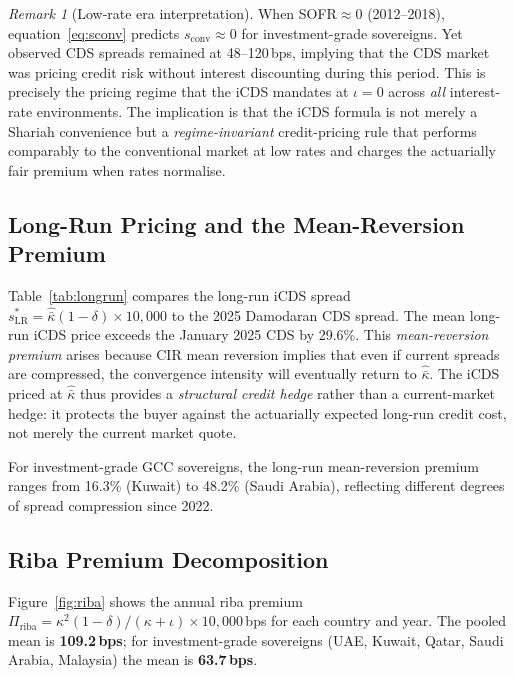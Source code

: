 \documentclass[12pt]{article}
\theoremstyle{plain}
\theoremstyle{definition}
\theoremstyle{remark}
\newtheorem{remark}{Remark}[section]
\begin{document}


\begin{remark}[Low-rate era interpretation]
  \label{rem:lowrate}
  When SOFR$\approx 0$ (2012--2018), equation~\eqref{eq:sconv} predicts
  $s_{\text{conv}} \approx 0$ for investment-grade sovereigns.
  Yet observed CDS spreads remained at 48--120\,bps, implying that the CDS
  market was pricing credit risk without interest discounting during this period.
  This is precisely the pricing regime that the iCDS mandates at $\iota=0$
  across \emph{all} interest-rate environments.
  The implication is that the iCDS formula is not merely a Shariah
  convenience but a \emph{regime-invariant} credit-pricing rule that performs
  comparably to the conventional market at low rates and charges the actuarially
  fair premium when rates normalise.
\end{remark}

\subsection{Long-Run Pricing and the Mean-Reversion Premium}

Table~\ref{tab:longrun} compares the long-run iCDS spread
$s^*_{\text{LR}} = \hat{\bar{\kappa}}(1-\delta)\times 10{,}000$
to the 2025 Damodaran CDS spread.
The mean long-run iCDS price exceeds the January 2025 CDS by 29.6\%.
This \emph{mean-reversion premium} arises because CIR mean reversion implies
that even if current spreads are compressed, the convergence intensity will
eventually return to $\hat{\bar{\kappa}}$.
The iCDS priced at $\hat{\bar{\kappa}}$ thus provides a \emph{structural
credit hedge} rather than a current-market hedge: it protects the buyer
against the actuarially expected long-run credit cost, not merely the
current market quote.

For investment-grade GCC sovereigns, the long-run mean-reversion premium
ranges from 16.3\% (Kuwait) to 48.2\% (Saudi Arabia), reflecting different
degrees of spread compression since 2022.



\subsection{Riba Premium Decomposition}

Figure~\ref{fig:riba} shows the annual riba premium
$\Pi_{\text{riba}} = \kappa^2(1-\delta)/(\kappa+\iota)\times 10{,}000$\,bps
for each country and year.
The pooled mean is \textbf{109.2\,bps}; for investment-grade sovereigns
(UAE, Kuwait, Qatar, Saudi Arabia, Malaysia) the mean is \textbf{63.7\,bps}.
\end{document}
